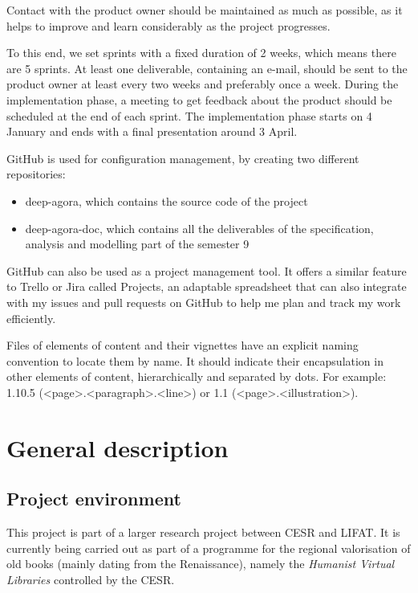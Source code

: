 \documentclass{polytech/polytech}
\numberwithin{figure}{chapter}
\begin{document}
Contact with the product owner should be maintained as much as possible, as it helps to improve and learn considerably as the project progresses.

To this end, we set sprints with a fixed duration of 2 weeks, which means there are 5 sprints.
At least one deliverable, containing an e-mail, should be sent to the product owner at least every two weeks and preferably once a week.
During the implementation phase, a meeting to get feedback about the product should be scheduled at the end of each sprint.
The implementation phase starts on 4 January and ends with a final presentation around 3 April.

GitHub is used for configuration management, by creating two different repositories:
\begin{itemize}
\item deep-agora, which contains the source code of the project
\item deep-agora-doc, which contains all the deliverables of the specification, analysis and modelling part of the semester 9
\end{itemize}

GitHub can also be used as a project management tool.
It offers a similar feature to Trello or Jira called Projects, an adaptable spreadsheet that can also integrate with my issues and pull requests on GitHub to help me plan and track my work efficiently.

Files of elements of content and their vignettes have an explicit naming convention to locate them by name.
It should indicate their encapsulation in other elements of content, hierarchically and separated by dots.
For example: 1.10.5 (<page>.<paragraph>.<line>) or 1.1 (<page>.<illustration>).



\chapter{General description}


\section{Project environment}

This project is part of a larger research project between CESR and LIFAT.
It is currently being carried out as part of a programme for the regional valorisation of old books (mainly dating from the Renaissance), namely the {\it Humanist Virtual Libraries} controlled by the CESR.
\end{document}
